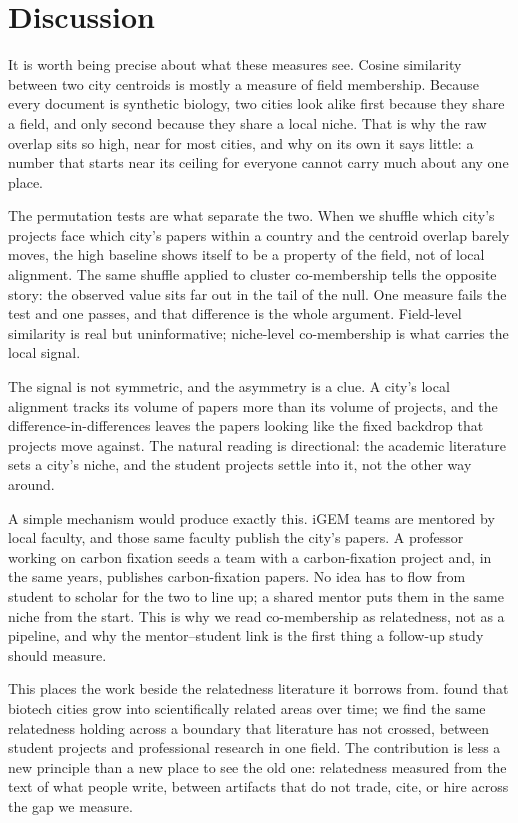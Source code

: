 \documentclass[12pt,a4paper]{article}
\begin{document}
	\section{Discussion}
	
	It is worth being precise about what these measures see. Cosine similarity between
	two city centroids is mostly a measure of field membership. Because every document
	is synthetic biology, two cities look alike first because they share a field, and
	only second because they share a local niche. That is why the raw overlap sits so
	high, near \statOverlapMean{} for most cities, and why on its own it says little: a
	number that starts near its ceiling for everyone cannot carry much about any one
	place.
	
	The permutation tests are what separate the two. When we shuffle which city's
	projects face which city's papers within a country and the centroid overlap barely
	moves, the high baseline shows itself to be a property of the field, not of local
	alignment. The same shuffle applied to cluster co-membership tells the opposite
	story: the observed value sits far out in the tail of the null. One measure fails
	the test and one passes, and that difference is the whole argument. Field-level
	similarity is real but uninformative; niche-level co-membership is what carries the
	local signal.
	
	The signal is not symmetric, and the asymmetry is a clue. A city's local alignment
	tracks its volume of papers more than its volume of projects, and the
	difference-in-differences leaves the papers looking like the fixed backdrop that
	projects move against. The natural reading is directional: the academic literature
	sets a city's niche, and the student projects settle into it, not the other way
	around.
	
	A simple mechanism would produce exactly this. iGEM teams are mentored by local
	faculty, and those same faculty publish the city's papers. A professor working on
	carbon fixation seeds a team with a carbon-fixation project and, in the same years,
	publishes carbon-fixation papers. No idea has to flow from student to scholar for
	the two to line up; a shared mentor puts them in the same niche from the start.
	This is why we read co-membership as relatedness, not as a pipeline, and why the
	mentor--student link is the first thing a follow-up study should measure.
	
	This places the work beside the relatedness literature it borrows from.
	\citet{boschmaScientificKnowledgeDynamics2014} found that biotech cities grow into
	scientifically related areas over time; we find the same relatedness holding across
	a boundary that literature has not crossed, between student projects and
	professional research in one field. The contribution is less a new principle than a
	new place to see the old one: relatedness measured from the text of what people
	write, between artifacts that do not trade, cite, or hire across the gap we measure.
	
\end{document}
